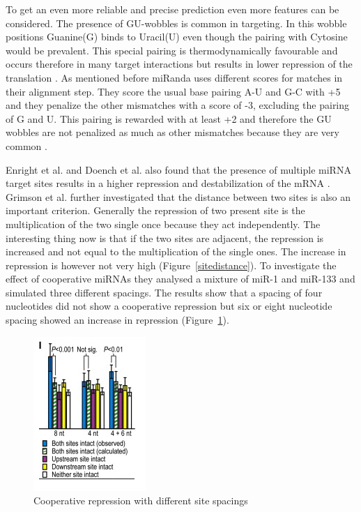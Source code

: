 \documentclass[12pt]{article}
\begin{document}
To get an even more reliable and precise prediction even more features can be considered. The presence of GU-wobbles is common in targeting. In this wobble positions Guanine(G) binds to Uracil(U) even though the pairing with Cytosine would be prevalent. This special pairing is thermodynamically favourable and occurs therefore in many target interactions but results in lower repression of the translation \cite{Doench}. As mentioned before miRanda uses different scores for matches in their alignment step. They score the usual base pairing A-U and G-C with +5 and they penalize the other mismatches with a score of -3, excluding the pairing of G and U. This pairing is rewarded with at least +2 and therefore the GU wobbles are not penalized as much as other mismatches because they are very common \cite{Enright}. 

Enright et al. and Doench et al. also found that the presence of multiple miRNA target sites results in a higher repression and destabilization of the mRNA \cite{Enright} \cite{Doench}. Grimson et al. \cite{Grimson} further investigated that the distance between two sites is also an important criterion. Generally the repression of two present site is the multiplication of the two single once because they act independently. The interesting thing now is that if the two sites are adjacent, the repression is increased and not equal to the multiplication of the single ones. The increase in repression is however not very high (Figure~\ref{sitedistance}). To investigate the effect of cooperative miRNAs they analysed a mixture of miR-1 and miR-133 and simulated three different spacings. The results show that a spacing of four nucleotides did not show a cooperative repression but six or eight nucleotide spacing showed an increase in repression (Figure~\ref{sitespacing}).


\begin{figure}[h]
\centering
\includegraphics[scale=1]{results/sites_8nt.PNG}  
\caption{Cooperative repression with different site spacings}
\label{sitespacing}
\end{figure}
\end{document}
